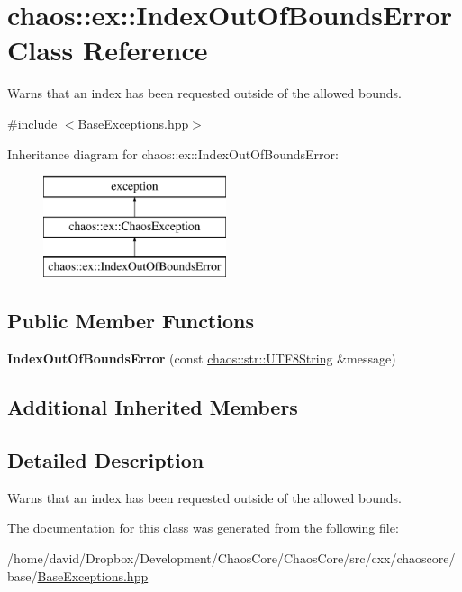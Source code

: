 \hypertarget{classchaos_1_1ex_1_1_index_out_of_bounds_error}{\section{chaos\-:\-:ex\-:\-:Index\-Out\-Of\-Bounds\-Error Class Reference}
\label{classchaos_1_1ex_1_1_index_out_of_bounds_error}
}


Warns that an index has been requested outside of the allowed bounds.  




{\ttfamily \#include $<$Base\-Exceptions.\-hpp$>$}

Inheritance diagram for chaos\-:\-:ex\-:\-:Index\-Out\-Of\-Bounds\-Error\-:\begin{figure}[H]
\begin{center}
\leavevmode
\includegraphics[height=3.000000cm]{classchaos_1_1ex_1_1_index_out_of_bounds_error}
\end{center}
\end{figure}
\subsection*{Public Member Functions}
\begin{DoxyCompactItemize}
\item 
\hypertarget{classchaos_1_1ex_1_1_index_out_of_bounds_error_a605674cdcd80159feffdc66bf4ae36f5}{{\bfseries Index\-Out\-Of\-Bounds\-Error} (const \hyperlink{classchaos_1_1str_1_1_u_t_f8_string}{chaos\-::str\-::\-U\-T\-F8\-String} \&message)}\label{classchaos_1_1ex_1_1_index_out_of_bounds_error_a605674cdcd80159feffdc66bf4ae36f5}

\end{DoxyCompactItemize}
\subsection*{Additional Inherited Members}


\subsection{Detailed Description}
Warns that an index has been requested outside of the allowed bounds. 

The documentation for this class was generated from the following file\-:\begin{DoxyCompactItemize}
\item 
/home/david/\-Dropbox/\-Development/\-Chaos\-Core/\-Chaos\-Core/src/cxx/chaoscore/base/\hyperlink{_base_exceptions_8hpp}{Base\-Exceptions.\-hpp}\end{DoxyCompactItemize}
